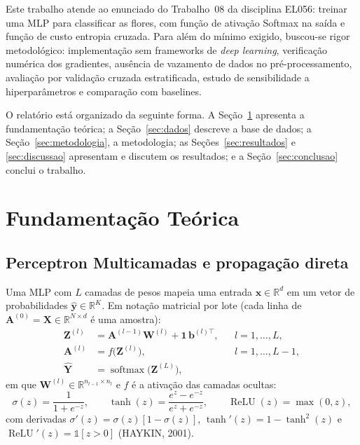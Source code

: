 \documentclass[12pt,a4paper]{article}
\begin{document}
Este trabalho atende ao enunciado do Trabalho~08 da disciplina EL056: treinar uma MLP para
classificar as flores, com função de ativação Softmax na saída e função de custo entropia cruzada.
Para além do mínimo exigido, buscou-se rigor metodológico: implementação sem frameworks de
\textit{deep learning}, verificação numérica dos gradientes, ausência de vazamento de dados no
pré-processamento, avaliação por validação cruzada estratificada, estudo de sensibilidade a
hiperparâmetros e comparação com baselines.

O relatório está organizado da seguinte forma. A Seção~\ref{sec:teoria} apresenta a fundamentação
teórica; a Seção~\ref{sec:dados} descreve a base de dados; a Seção~\ref{sec:metodologia}, a
metodologia; as Seções~\ref{sec:resultados} e \ref{sec:discussao} apresentam e discutem os
resultados; e a Seção~\ref{sec:conclusao} conclui o trabalho.

\section{Fundamentação Teórica}
\label{sec:teoria}

\subsection{Perceptron Multicamadas e propagação direta}

Uma MLP com $L$ camadas de pesos mapeia uma entrada $\mathbf{x}\in\mathbb{R}^{d}$ em um vetor de
probabilidades $\hat{\mathbf{y}}\in\mathbb{R}^{K}$. Em notação matricial por lote (cada linha de
$\mathbf{A}^{(0)}=\mathbf{X}\in\mathbb{R}^{N\times d}$ é uma amostra):
\begin{align}
  \mathbf{Z}^{(l)} &= \mathbf{A}^{(l-1)}\mathbf{W}^{(l)} + \mathbf{1}\,\mathbf{b}^{(l)\top},
  && l = 1,\dots,L, \label{eq:z}\\
  \mathbf{A}^{(l)} &= f\big(\mathbf{Z}^{(l)}\big), && l = 1,\dots,L-1, \label{eq:a}\\
  \hat{\mathbf{Y}} &= \operatorname{softmax}\big(\mathbf{Z}^{(L)}\big), \label{eq:saida}
\end{align}
em que $\mathbf{W}^{(l)}\in\mathbb{R}^{n_{l-1}\times n_l}$ e $f$ é a ativação das camadas ocultas:
\begin{equation}
  \sigma(z)=\frac{1}{1+e^{-z}},\qquad \tanh(z)=\frac{e^{z}-e^{-z}}{e^{z}+e^{-z}},\qquad
  \operatorname{ReLU}(z)=\max(0,z), \label{eq:ativacoes}
\end{equation}
com derivadas $\sigma'(z)=\sigma(z)[1-\sigma(z)]$, $\tanh'(z)=1-\tanh^2(z)$ e
$\operatorname{ReLU}'(z)=\mathbb{1}[z>0]$ (HAYKIN, 2001).
\end{document}
